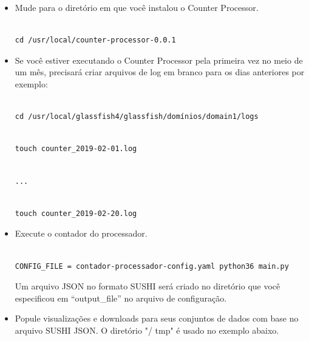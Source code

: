 \documentclass[12pt,hidelinks]{article}
\begin{document}
\begin{itemize}

\item Mude para o diretório em que você instalou o Counter Processor.

\begin{verbatim}

cd /usr/local/counter-processor-0.0.1

\end{verbatim}

\item Se você estiver executando o Counter Processor pela primeira vez no meio de um mês, precisará criar arquivos de log em branco para os dias anteriores por exemplo:

\begin{verbatim}

cd /usr/local/glassfish4/glassfish/domínios/domain1/logs

\end{verbatim}

\begin{verbatim}

touch counter_2019-02-01.log

\end{verbatim}

\begin{verbatim}

...

\end{verbatim}

\begin{verbatim}

touch counter_2019-02-20.log

\end{verbatim}

\item Execute o contador do processador.

\begin{verbatim}

CONFIG_FILE = contador-processador-config.yaml python36 main.py

\end{verbatim}

Um arquivo JSON no formato SUSHI será criado no diretório que você especificou em “output\_file” no arquivo de configuração.

\item Popule visualizações e downloads para seus conjuntos de dados com base no arquivo SUSHI JSON. O diretório "/ tmp" é usado no exemplo abaixo.


\end{itemize}
\end{document}
